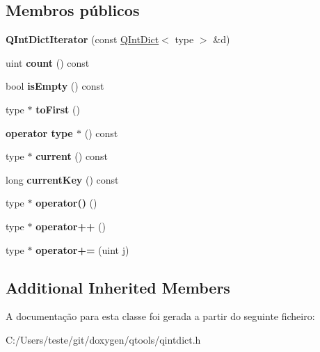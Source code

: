 \subsection*{Membros públicos}
\begin{DoxyCompactItemize}
\item 
\hypertarget{class_q_int_dict_iterator_a8178dceaf5a17449b47d0499fa0b31c0}{{\bfseries Q\-Int\-Dict\-Iterator} (const \hyperlink{class_q_int_dict}{Q\-Int\-Dict}$<$ type $>$ \&d)}\label{class_q_int_dict_iterator_a8178dceaf5a17449b47d0499fa0b31c0}

\item 
\hypertarget{class_q_int_dict_iterator_a774149fc271ebaba2aabcd183a836e8f}{uint {\bfseries count} () const }\label{class_q_int_dict_iterator_a774149fc271ebaba2aabcd183a836e8f}

\item 
\hypertarget{class_q_int_dict_iterator_a479432127ee77145cc19d6a2d1590821}{bool {\bfseries is\-Empty} () const }\label{class_q_int_dict_iterator_a479432127ee77145cc19d6a2d1590821}

\item 
\hypertarget{class_q_int_dict_iterator_a7e3cadfe5d178fc4db2e97112af20024}{type $\ast$ {\bfseries to\-First} ()}\label{class_q_int_dict_iterator_a7e3cadfe5d178fc4db2e97112af20024}

\item 
\hypertarget{class_q_int_dict_iterator_a2e144510e7eb044f9d96660f6590a589}{{\bfseries operator type $\ast$} () const }\label{class_q_int_dict_iterator_a2e144510e7eb044f9d96660f6590a589}

\item 
\hypertarget{class_q_int_dict_iterator_ac22b90cda8a81fe45ae121578fcf9726}{type $\ast$ {\bfseries current} () const }\label{class_q_int_dict_iterator_ac22b90cda8a81fe45ae121578fcf9726}

\item 
\hypertarget{class_q_int_dict_iterator_a0cd88e4ca06fcb7b7d2ff13002877ac5}{long {\bfseries current\-Key} () const }\label{class_q_int_dict_iterator_a0cd88e4ca06fcb7b7d2ff13002877ac5}

\item 
\hypertarget{class_q_int_dict_iterator_a53bb20f7dd4f90cc047f999b7dec5fe0}{type $\ast$ {\bfseries operator()} ()}\label{class_q_int_dict_iterator_a53bb20f7dd4f90cc047f999b7dec5fe0}

\item 
\hypertarget{class_q_int_dict_iterator_a60e0a5b2a616525ebaec6c235b066c3e}{type $\ast$ {\bfseries operator++} ()}\label{class_q_int_dict_iterator_a60e0a5b2a616525ebaec6c235b066c3e}

\item 
\hypertarget{class_q_int_dict_iterator_a689beef631dff5b294c16f1246e6c230}{type $\ast$ {\bfseries operator+=} (uint j)}\label{class_q_int_dict_iterator_a689beef631dff5b294c16f1246e6c230}

\end{DoxyCompactItemize}
\subsection*{Additional Inherited Members}


A documentação para esta classe foi gerada a partir do seguinte ficheiro\-:\begin{DoxyCompactItemize}
\item 
C\-:/\-Users/teste/git/doxygen/qtools/qintdict.\-h\end{DoxyCompactItemize}
